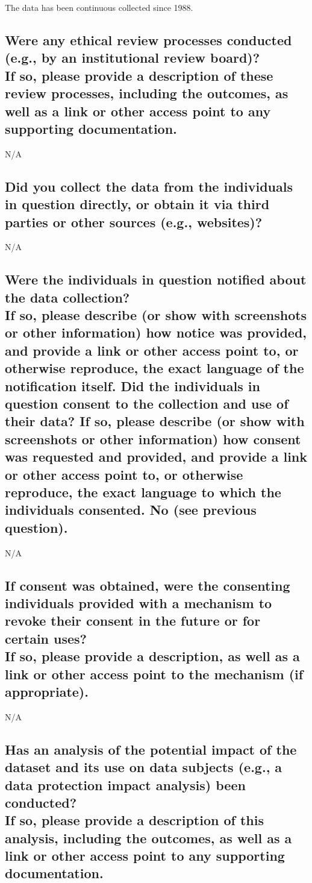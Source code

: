 \documentclass[letterpaper, 10 pt, conference]{ieeeconf}  %
\newcommand{\subtitle}[1]{{\\ \small \normalfont \color{purple} #1}}
\begin{document}
The data has been continuous collected since 1988.

\subsection{Were any ethical review processes conducted (e.g., by an institutional review board)? \subtitle{If so, please provide a description of these review processes, including the outcomes, as well as a link or other access point to any supporting documentation.}}

N/A

\subsection{Did you collect the data from the individuals in question directly, or obtain it via third parties or other sources (e.g., websites)?}

N/A

\subsection{Were the individuals in question notified about the data collection? \subtitle{If so, please describe (or show with screenshots or other information) how notice was provided, and provide a link or other access point to, or otherwise reproduce, the exact language of the notification itself. Did the individuals in question consent to the collection and use of their data? If so, please describe (or show with screenshots or other information) how consent was requested and provided, and provide a link or other access point to, or otherwise reproduce, the exact language to which the individuals consented. No (see previous question).}}

N/A

\subsection{If consent was obtained, were the consenting individuals provided with a mechanism to revoke their consent in the future or for certain uses? \subtitle{If so, please provide a description, as well as a link or other access point to the mechanism (if appropriate).}}

N/A

\subsection{Has an analysis of the potential impact of the dataset and its use on data subjects (e.g., a data protection impact analysis) been conducted? \subtitle{If so, please provide a description of this analysis, including the outcomes, as well as a link or other access point to any supporting documentation.}}
\end{document}
